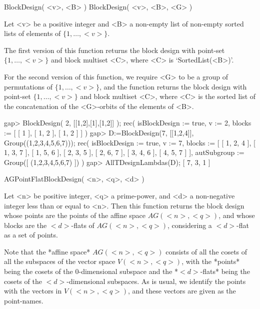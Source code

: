 %
%
%
%
\def\DESIGN{\sf DESIGN}
\def\GRAPE{\sf GRAPE}
\def\nauty{\it nauty}
\def\Aut{{\rm Aut}\,}
\def\lcm{{\rm lcm}\,}
\def\x{\times}


\>BlockDesign( <v>, <B> )
\>BlockDesign( <v>, <B>, <G> )

Let <v> be a positive integer and <B> a non-empty list of non-empty
sorted lists of elements of $\{1,\ldots,<v>\}$.

The first version of this function returns the block design with point-set
$\{1,\ldots,<v>\}$ and block multiset <C>, where <C> is `SortedList(<B>)'.

For the second version of this function, we require <G> to be a group
of permutations of $\{1,\ldots,<v>\}$, and the function returns the
block design with point-set $\{1,\ldots,<v>\}$ and block multiset <C>,
where <C> is the sorted list of the concatenation of the <G>-orbits of
the elements of <B>.

\beginexample
gap> BlockDesign( 2, [[1,2],[1],[1,2]] );
rec( isBlockDesign := true, v := 2, blocks := [ [ 1 ], [ 1, 2 ], [ 1, 2 ] ] )
gap> D:=BlockDesign(7, [[1,2,4]], Group((1,2,3,4,5,6,7)));
rec( isBlockDesign := true, v := 7, 
  blocks := [ [ 1, 2, 4 ], [ 1, 3, 7 ], [ 1, 5, 6 ], [ 2, 3, 5 ], 
      [ 2, 6, 7 ], [ 3, 4, 6 ], [ 4, 5, 7 ] ], 
  autSubgroup := Group([ (1,2,3,4,5,6,7) ]) )
gap> AllTDesignLambdas(D);
[ 7, 3, 1 ]
\endexample



\>AGPointFlatBlockDesign( <n>, <q>, <d> )

Let <n> be positive integer, <q> a prime-power, and <d> a non-negative
integer less than or equal to <n>. Then this function returns the block
design whose points are the points of the affine space $AG(<n>,<q>)$,
and whose blocks are the $<d>$-flats of $AG(<n>,<q>)$, considering a
$<d>$-flat as a set of points.

Note that the *affine space* $AG(<n>,<q>)$ consists of all the cosets of
all the subspaces of the vector space $V(<n>,<q>)$, with the *points*
being the cosets of the $0$-dimensional subspace and the *$<d>$-flats*
being the cosets of the $<d>$-dimensional subspaces. As is usual, we
identify the points with the vectors in $V(<n>,<q>)$, and these vectors
are given as the point-names.

